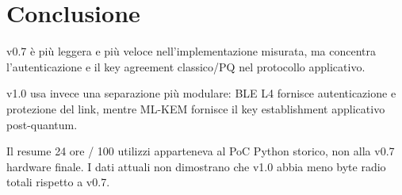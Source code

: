 \documentclass[11pt,a4paper]{article}
\begin{document}
\section{Conclusione}
v0.7 è più leggera e più veloce nell'implementazione misurata, ma concentra
l'autenticazione e il key agreement classico/PQ nel protocollo applicativo.

v1.0 usa invece una separazione più modulare: BLE L4 fornisce autenticazione e
protezione del link, mentre ML-KEM fornisce il key establishment applicativo
post-quantum.

Il resume 24 ore / 100 utilizzi apparteneva al PoC Python storico, non alla
v0.7 hardware finale. I dati attuali non dimostrano che v1.0 abbia meno byte
radio totali rispetto a v0.7.
\end{document}
